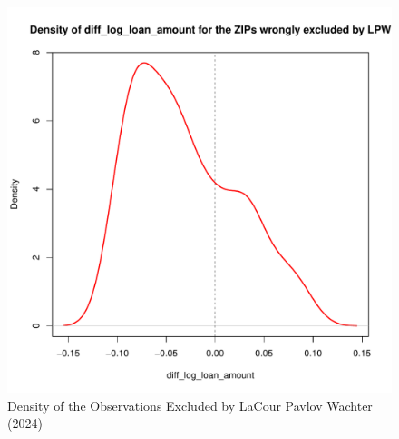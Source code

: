 \documentclass{article}
\begin{document}


\clearpage
\pagebreak

\begin{figure}
    
    \caption{Density of the Observations Excluded by LaCour Pavlov Wachter (2024)}

    \begin{center}
        \includegraphics[scale=0.5]{figures/density_diff_log_loan_amount_excluded_ZIPs.pdf}
    \end{center}

\end{figure}



\clearpage
\pagebreak
\end{document}
